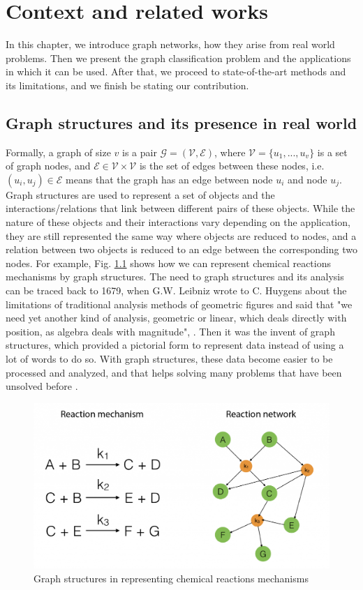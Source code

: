 \addchapheadtotoc
\chapter{Context and related works}
 In this chapter, we introduce graph networks, how they arise from real world problems. Then we present the graph classification problem and the applications in which it can be used. After that, we proceed to state-of-the-art methods and its limitations, and we finish be stating our contribution. 
\section{Graph structures and its presence in real world}
Formally, a graph of size $v$ is a pair $\mathcal{G}=(\mathcal{V},\mathcal{E})$, where $\mathcal{V}=\{u_1,...,u_v\}$ is a set of  graph nodes, and $\mathcal{E}\in \mathcal{V}\times \mathcal{V}$ is the set of edges between these nodes, i.e. $(u_i, u_j)\in \mathcal{E}$ means that the graph has an edge between node $u_i$ and node $u_j$.
Graph structures are used to represent a set of objects and the interactions/relations that link between different pairs of these objects.  While the nature of these objects and their interactions vary depending on the application, they are still represented the same way where objects are reduced to nodes, and a relation between two objects is reduced to an edge between the corresponding two nodes. For example, Fig. \ref{fig:Graph_Example} shows how we can represent chemical reactions mechanisms by  graph structures.\newline
The need to graph structures and its analysis can be traced back to 1679, when G.W.  Leibniz  wrote to C. Huygens about the limitations of traditional analysis methods of geometric figures and said that "we need yet another kind of analysis, geometric or linear, which deals directly with position, as algebra deals with magnitude", \citep{Graph_application}. Then it was the invent of graph structures, which provided a pictorial form to represent data instead of using a lot of words to do so. With graph structures, these data become easier to be processed and analyzed, and that helps solving many problems that have been unsolved before \citep{Graph_application}.
\begin{figure}[H]
\centering
\includegraphics[scale=0.2]{LatexDiss/Dissertation/figs/Graph_example.png}
\caption[Graph example to represent Chemical Reactions]{Graph structures in representing chemical reactions mechanisms}
\label{fig:Graph_Example}
\end{figure}
